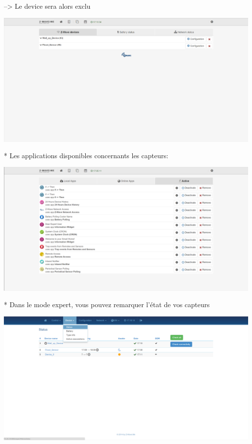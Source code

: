 --> Le device sera alors exclu


\includegraphics[scale=0.5]{./Images/png/devices_exclu_zwaveme.png}\newline


* Les applications disponibles concernants les capteurs:

\includegraphics[scale=0.5]{./Images/png/app_zwaveme.png}\newline 

* Dans le mode expert, vous pouvez remarquer l'état de vos capteurs

\includegraphics[scale=0.5]{./Images/png/device_Status.png}\newline


